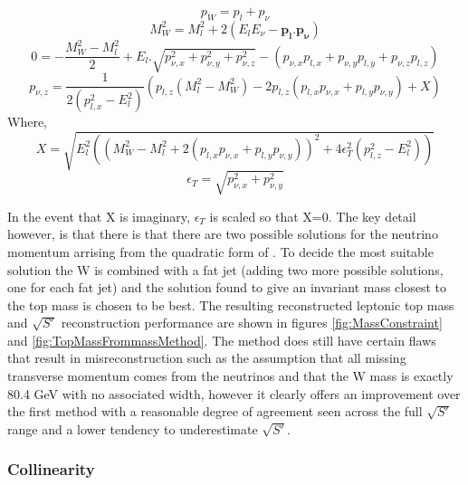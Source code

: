 \begin{equation}
  p_W=p_l+p_\nu
\end{equation}
\begin{equation}
M_W^2=M_l^2 + 2(E_lE_\nu - \mathbf{p_l.p_\nu})
\end{equation}
\begin{equation}
0=-\frac{M_W^2-M_l^2}{2} + E_l.\sqrt{p^2_{\nu , x}+p^2_{\nu , y}+p^2_{\nu , z}} - (p_{\nu , x}p_{l , x}+p_{\nu , y}p_{l , y}+p_{\nu , z}p_{l , z})
\end{equation}
\begin{equation}
p_{\nu , z}=\frac{1}{2(p^2_{l , x}-E^2_{l})} (p_{l , z}(M_l^2-M_W^2)-2p_{l , z}(p_{l , x}p_{\nu , x}+p_{l , y}p_{\nu , y}) + X)
\end{equation}
Where,
\begin{equation}
  \label{eq:X}
  X=\sqrt{E_l^2((M_W^2-M_l^2 +2(p_{l , x}p_{\nu , x}+p_{l , y}p_{\nu , y}))^2 +4\epsilon_T^2(p^2_{l , z}-E_l^2) )}
\end{equation}
\begin{equation}
  \epsilon_T=\sqrt{p^2_{\nu , x}+p^2_{\nu , y}}
\end{equation}

In the event that X is imaginary, $\epsilon_T$ is scaled so that X=0. The key detail however, is that there is that there are two possible solutions for the neutrino momentum arrising from the quadratic form of . To decide the most suitable solution the W is combined with a fat jet (adding two more possible solutions, one for each fat jet) and the solution found to give an invariant mass closest to the top mass is chosen to be best. The resulting reconstructed leptonic top mass and $\sqrt{S'}$ reconstruction performance are shown in figures \ref{fig:MassConstraint} and \ref{fig:TopMassFrommassMethod}. The method does still have certain flaws that result in misreconstruction such as the assumption that all missing transverse momentum comes from the neutrinos and that the W mass is exactly 80.4 GeV with no associated width, however it clearly offers an improvement over the first method with a reasonable degree of agreement seen across the full $\sqrt{S'}$ range and a lower tendency to underestimate $\sqrt{S'}$.

\subsubsection{Collinearity}

